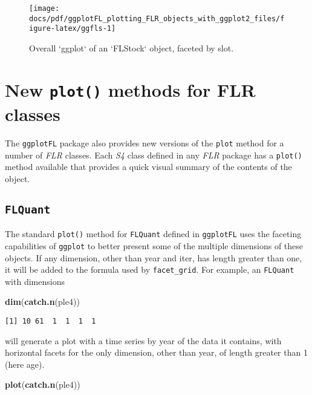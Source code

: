 \documentclass[]{article}
\newenvironment{Shaded}{\begin{snugshade}}{\end{snugshade}}
\newcommand{\KeywordTok}[1]{\textcolor[rgb]{0.13,0.29,0.53}{\textbf{{#1}}}}
\newcommand{\NormalTok}[1]{{#1}}
\begin{document}
\begin{figure}

{\centering \texttt{[image: docs/pdf/ggplotFL\_plotting\_FLR\_objects\_with\_ggplot2\_files/figure-latex/ggfls-1]} 

}

\caption{Overall `ggplot` of an `FLStock` object, faceted by slot.}\label{fig:ggfls}
\end{figure}

\section{\texorpdfstring{New \texttt{plot()} methods for FLR
classes}{New plot() methods for FLR classes}}\label{new-plot-methods-for-flr-classes}

The \texttt{ggplotFL} package also provides new versions of the
\texttt{plot} method for a number of \emph{FLR} classes. Each \emph{S4}
class defined in any \emph{FLR} package has a \texttt{plot()} method
available that provides a quick visual summary of the contents of the
object.

\subsection{\texorpdfstring{\texttt{FLQuant}}{FLQuant}}\label{flquant-1}

The standard \texttt{plot()} method for \texttt{FLQuant} defined in
\texttt{ggplotFL} uses the faceting capabilities of \texttt{ggplot} to
better present some of the multiple dimensions of these objects. If any
dimension, other than year and iter, has length greater than one, it
will be added to the formula used by \texttt{facet\_grid}. For example,
an \texttt{FLQuant} with dimensions

\begin{Shaded}
\begin{Highlighting}[]
\KeywordTok{dim}\NormalTok{(}\KeywordTok{catch.n}\NormalTok{(ple4))}
\end{Highlighting}
\end{Shaded}

\begin{verbatim}
[1] 10 61  1  1  1  1
\end{verbatim}

will generate a plot with a time series by year of the data it contains,
with horizontal facets for the only dimension, other than year, of
length greater than 1 (here age).

\begin{Shaded}
\begin{Highlighting}[]
\KeywordTok{plot}\NormalTok{(}\KeywordTok{catch.n}\NormalTok{(ple4))}
\end{Highlighting}
\end{Shaded}
\end{document}
